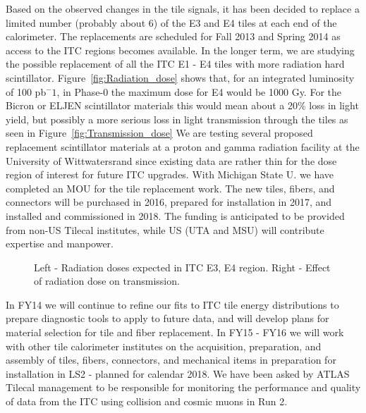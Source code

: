 Based on the observed changes in the tile signals, it has been decided to replace
a limited number (probably about 6) of the E3 and E4 tiles at each end of the calorimeter.
The replacements are scheduled for Fall 2013 and Spring 2014 as access to the ITC
regions becomes available. In the longer term, we are studying the possible
replacement of all the ITC E1 - E4 tiles with more radiation hard scintillator. 
Figure~\ref{fig:Radiation_dose} shows that, for an integrated luminosity of 100 pb$^-1$,
in Phase-0 the maximum dose for E4 would be 1000 Gy. For the Bicron or ELJEN
scintillator materials this would mean about a 20\% loss in light yield, but
possibly a more serious loss in light transmission through the tiles as seen in Figure~\ref{fig:Transmission_dose}
We are testing several proposed replacement scintillator materials at a proton and gamma
radiation facility at the University of Wittwatersrand since existing data are
rather thin for the dose region of interest for future ITC upgrades. With Michigan State U.
we have completed an MOU for the tile replacement work. The new tiles, fibers, and
connectors will be purchased in 2016, prepared for installation in 2017, and installed
and commissioned in 2018. The funding is anticipated to be provided from non-US Tilecal
institutes, while US (UTA and MSU) will contribute expertise and manpower.


\begin{figure}[htb]
\centering
{}
%
%
\quad
{}

\caption{Left - Radiation doses expected in ITC E3, E4 region. Right - Effect of radiation dose on transmission.}
\end{figure} 

In FY14 we will continue to refine our fits to ITC tile energy distributions to prepare
diagnostic tools to apply to future data, and will develop plans for material selection 
for tile and fiber replacement. In FY15 - FY16 we will work with other tile calorimeter
institutes on the acquisition, preparation, and assembly of tiles, fibers, connectors,
and mechanical items in preparation for installation in LS2 - planned for calendar 2018.
We have been asked by ATLAS Tilecal management to be responsible for monitoring the
performance and quality of data from the ITC using collision and cosmic muons in Run 2.

